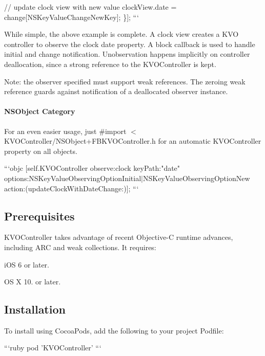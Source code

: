 // update clock view with new value clock\+View.\+date = change\mbox{[}N\+S\+Key\+Value\+Change\+New\+Key\mbox{]}; \}\mbox{]}; ```

While simple, the above example is complete. A clock view creates a K\+V\+O controller to observe the clock date property. A block callback is used to handle initial and change notification. Unobservation happens implicitly on controller deallocation, since a strong reference to the {\ttfamily K\+V\+O\+Controller} is kept.

Note\+: the observer specified must support weak references. The zeroing weak reference guards against notification of a deallocated observer instance.

\paragraph*{N\+S\+Object Category}

For an even easier usage, just {\ttfamily \#import $<$K\+V\+O\+Controller/\+N\+S\+Object+\+F\+B\+K\+V\+O\+Controller.h} for an automatic {\ttfamily K\+V\+O\+Controller} property on all objects.

```objc \mbox{[}self.\+K\+V\+O\+Controller observe\+:clock key\+Path\+:"date" options\+:N\+S\+Key\+Value\+Observing\+Option\+Initial$\vert$\+N\+S\+Key\+Value\+Observing\+Option\+New action\+:(update\+Clock\+With\+Date\+Change\+:)\mbox{]}; ```

\subsection*{Prerequisites}

K\+V\+O\+Controller takes advantage of recent Objective-\/\+C runtime advances, including A\+R\+C and weak collections. It requires\+:


\begin{DoxyItemize}
\item i\+O\+S 6 or later.
\item O\+S X 10. or later.
\end{DoxyItemize}

\subsection*{Installation}

To install using Cocoa\+Pods, add the following to your project Podfile\+:

```ruby pod 'K\+V\+O\+Controller' ```

